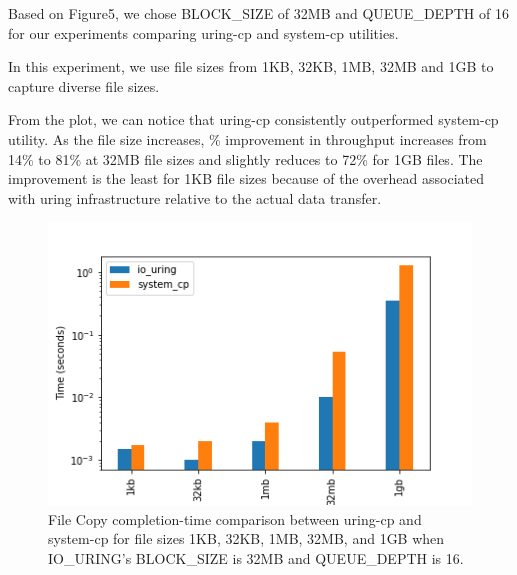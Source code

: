 \documentclass{article}
\begin{document}
Based on Figure5, we chose BLOCK\_SIZE of 32MB and QUEUE\_DEPTH of 16 for our experiments comparing uring-cp and system-cp 
utilities. 

In this experiment, we use file sizes from 1KB, 32KB, 1MB, 32MB and 1GB to capture diverse file sizes.

From the plot, we can notice that uring-cp consistently outperformed system-cp utility. As the file size increases, \% improvement 
in throughput increases from 14\% to 81\% at 32MB file sizes and slightly reduces to 72\% for 1GB files. 
The improvement is the least for 1KB file sizes because of the overhead associated with uring infrastructure relative to the 
actual data transfer. 

\begin{figure}
    \centering
    \includegraphics[scale = 0.6]{cp_perf_compare.png}
    \caption{File Copy completion-time comparison between uring-cp and system-cp for file sizes
    1KB, 32KB, 1MB, 32MB, and 1GB when IO\_URING's BLOCK\_SIZE is 32MB and QUEUE\_DEPTH is 16.}
    \label{Figure6}
\end{figure}
\end{document}
